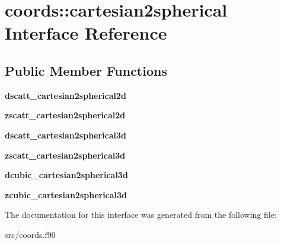 \hypertarget{interfacecoords_1_1cartesian2spherical}{}\section{coords\+:\+:cartesian2spherical Interface Reference}
\label{interfacecoords_1_1cartesian2spherical}
\subsection*{Public Member Functions}
\begin{DoxyCompactItemize}
\item 
\mbox{\label{interfacecoords_1_1cartesian2spherical_a4ed11efef005233cc5c047b84cdf0c82}} 
{\bfseries dscatt\+\_\+cartesian2spherical2d}
\item 
\mbox{\label{interfacecoords_1_1cartesian2spherical_a78a98d16e4adbf995a537b38e579ea1b}} 
{\bfseries zscatt\+\_\+cartesian2spherical2d}
\item 
\mbox{\label{interfacecoords_1_1cartesian2spherical_a1c4ffadb9757dfb6aa43021bb146a08c}} 
{\bfseries dscatt\+\_\+cartesian2spherical3d}
\item 
\mbox{\label{interfacecoords_1_1cartesian2spherical_af7bb7e6c9cdd5edd3ea1d8ea9ade18d3}} 
{\bfseries zscatt\+\_\+cartesian2spherical3d}
\item 
\mbox{\label{interfacecoords_1_1cartesian2spherical_a81fca726f4f613cd788598cc64c745ab}} 
{\bfseries dcubic\+\_\+cartesian2spherical3d}
\item 
\mbox{\label{interfacecoords_1_1cartesian2spherical_a5868e63f8aadfd6623340d14ac43447a}} 
{\bfseries zcubic\+\_\+cartesian2spherical3d}
\end{DoxyCompactItemize}


The documentation for this interface was generated from the following file\+:\begin{DoxyCompactItemize}
\item 
src/coords.\+f90\end{DoxyCompactItemize}
